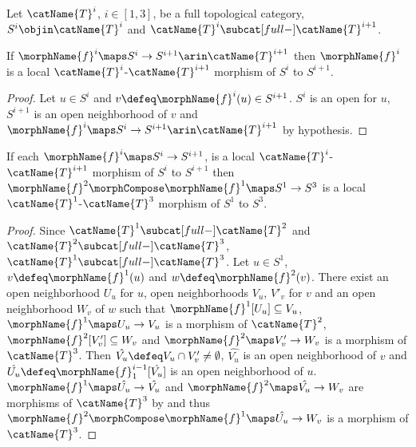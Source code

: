 \documentclass{article}
\begin{document}
\begin{lemma}
\label{lem:topLocal}
Let $\catName{T}^i$, $i \in [1,3]$, be a full topological category,
$S^i \objin \catName{T}^i$ and
$\catName{T}^i \subcat[full-] \catName{T}^{i+1}$.

If $\morphName{f}^i \maps S^i \to S^{i+1} \arin \catName{T}^{i+1}$ then
$\morphName{f}^i$ is a local $\catName{T}^i$-$\catName{T}^{i+1}$
morphism of $S^i$ to $S^{i+1}$.

\begin{proof}
Let $u \in S^i$ and $v \defeq \morphName{f}^i(u) \in S^{i+1}$. $S^i$ is
an open for $u$, $S^{i+1}$ is an open neighborhood of $v$ and
$\morphName{f}^i \maps S^i \to S^{i+1} \arin \catName{T}^{i+1}$ by
hypothesis.
\end{proof}

If each $\morphName{f}^i \maps S^i \to S^{i+1}$, is a local
$\catName{T}^i$-$\catName{T}^{i+1}$ morphism of $S^i$ to
$S^{i+1}$ then
$\morphName{f}^2 \morphCompose \morphName{f}^1 \maps S^1 \to S^3$ is a local
$\catName{T}^1$-$\catName{T}^3$ morphism of $S^1$ to $S^3$.

\begin{proof}
Since $\catName{T}^1 \subcat[full-] \catName{T}^2$ and
$\catName{T}^2 \subcat[full-] \catName{T}^3$,
$\catName{T}^1 \subcat[full-] \catName{T}^3$.
Let $u \in S^1$, $v \defeq \morphName{f}^1(u)$ and
$w \defeq \morphName{f}^2(v)$. There exist an open neighborhood $U_u$
for $u$, open neighborhoods $V_u$, $V'_v$ for $v$ and an open
neighborhood $W_v$ of $w$ such that
$\morphName{f}^1[U_u] \subseteq V_u$,
$\morphName{f}^1 \maps U_u \to V_u$ is a morphism of $\catName{T}^2$,
$\morphName{f}^2[V'_v] \subseteq W_v$ and
$\morphName{f}^2 \maps V'_v \to W_v$ is a morphism of $\catName{T}^3$.
Then $\hat{V_u} \defeq V_u \cap V'_v \neq \emptyset$, $\hat{V_u}$ is an
open neighborhood of $v$ and
$\hat{U_u} \defeq \morphName{f}^{i-1}_1[\hat{V_u}]$ is an open
neighborhood of $u$.  $\morphName{f}^1 \maps \hat{U_u} \to \hat{V_u}$
and $\morphName{f}^2 \maps \hat{V_u} \to W_v$ are morphisms of
$\catName{T}^3$ by  and thus
$\morphName{f}^2 \morphCompose \morphName{f}^1 \maps \hat{U_u} \to W_v$ is a
morphism of $\catName{T}^3$.
\end{proof}
\end{lemma}
\end{document}
